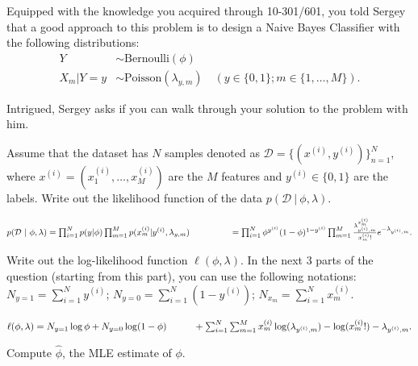 \begin{parts}
Equipped with the knowledge you acquired through 10-301/601, you told Sergey that a good approach to this problem is to design a Naive Bayes Classifier with the following distributions:
\begin{align*}
    Y &\sim \text{Bernoulli}(\phi) \\
    X_m|Y = y &\sim \text{Poisson}(\lambda_{y, m}) \quad (y \in \{0, 1\}; m \in \{1, \ldots, M\}).
\end{align*}

Intrigued, Sergey asks if you can walk through your solution to the problem with him.

\begin{subparts}
    \subpart[2] Assume that the dataset has $N$ samples denoted as $\mathcal{D} = \{(x^{(i)}, y^{(i)})\}_{n=1}^N$, where $x^{(i)} = (x^{(i)}_1, \ldots, x^{(i)}_M)$ are the $M$ features and $y^{(i)} \in \{0, 1\}$ are the labels. Write out the likelihood function of the data $p(\mathcal{D}~|~\phi, \lambda)$.
        \begin{tcolorbox}[fit,height=2cm, width=15cm, blank, borderline={1pt}{-2pt}]
        \end{tcolorbox}
        \begin{soln}
            $ p(\mathcal{D}~|~\phi, \lambda) = \prod_{i=1}^N p(y|\phi) \prod_{m=1}^M p(x^{(i)}_m|y^{(i)}, \lambda_{y,m}) \\\phantom{p(\mathcal{D}~|~\phi, \lambda)}= \prod_{i=1}^N \phi^{y^{(i)}} (1-\phi)^{1-y^{(i)}} \prod_{m=1}^M \frac{\lambda_{y^{(i)},m}^{x^{(i)}_m}}{x^{(i)}_m!}e^{-\lambda_{y^{(i)},m}}. $
        \end{soln}
    \subpart[1] Write out the log-likelihood function $\ell(\phi, \lambda)$. In the next 3 parts of the question (starting from this part), you can use the following notations: $N_{y=1} = \sum_{i=1}^N y^{(i)}$; $N_{y=0} = \sum_{i=1}^N (1 - y^{(i)})$; $N_{x_m} = \sum_{i=1}^N x_m^{(i)}$.
        \begin{tcolorbox}[fit,height=2cm, width=15cm, blank, borderline={1pt}{-2pt}]
        \end{tcolorbox}
        \begin{soln}
            $ \ell(\phi, \lambda) = N_{y=1}\log \phi + N_{y=0} \log(1-\phi)  \\
            \phantom{\ell(\phi, \lambda)} + \sum_{i=1}^N \sum_{m=1}^M x_m^{(i)} \log(\lambda_{y^{(i)},m}) - \log(x_m^{(i)}!) - \lambda_{y^{(i)},m}. $
        \end{soln}
    \subpart[2] Compute $\hat{\phi}$, the MLE estimate of $\phi$.

\end{subparts}
\end{parts}
